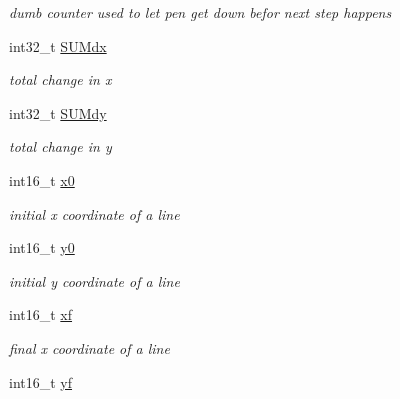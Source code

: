 \begin{DoxyCompactItemize}
\begin{DoxyCompactList}\small\item\em dumb counter used to let pen get down befor next step happens \end{DoxyCompactList}\item 
\hypertarget{classtask__lines_aa7134592021b616761cad2811618aa5c}{int32\-\_\-t \hyperlink{classtask__lines_aa7134592021b616761cad2811618aa5c}{S\-U\-Mdx}}\label{classtask__lines_aa7134592021b616761cad2811618aa5c}

\begin{DoxyCompactList}\small\item\em total change in x \end{DoxyCompactList}\item 
\hypertarget{classtask__lines_a89408d73e8e7a9b53586c55418fd2710}{int32\-\_\-t \hyperlink{classtask__lines_a89408d73e8e7a9b53586c55418fd2710}{S\-U\-Mdy}}\label{classtask__lines_a89408d73e8e7a9b53586c55418fd2710}

\begin{DoxyCompactList}\small\item\em total change in y \end{DoxyCompactList}\item 
\hypertarget{classtask__lines_a4eb29ee98cb4b6a555ddd43804054179}{int16\-\_\-t \hyperlink{classtask__lines_a4eb29ee98cb4b6a555ddd43804054179}{x0}}\label{classtask__lines_a4eb29ee98cb4b6a555ddd43804054179}

\begin{DoxyCompactList}\small\item\em initial x coordinate of a line \end{DoxyCompactList}\item 
\hypertarget{classtask__lines_a0748460c610b0bb8e9cfd8b698206ec1}{int16\-\_\-t \hyperlink{classtask__lines_a0748460c610b0bb8e9cfd8b698206ec1}{y0}}\label{classtask__lines_a0748460c610b0bb8e9cfd8b698206ec1}

\begin{DoxyCompactList}\small\item\em initial y coordinate of a line \end{DoxyCompactList}\item 
\hypertarget{classtask__lines_a13189d18f9ae3bce0e07b23bb9831325}{int16\-\_\-t \hyperlink{classtask__lines_a13189d18f9ae3bce0e07b23bb9831325}{xf}}\label{classtask__lines_a13189d18f9ae3bce0e07b23bb9831325}

\begin{DoxyCompactList}\small\item\em final x coordinate of a line \end{DoxyCompactList}\item 
\hypertarget{classtask__lines_a8cff318f4dc88da0621ba31acbd44d3d}{int16\-\_\-t \hyperlink{classtask__lines_a8cff318f4dc88da0621ba31acbd44d3d}{yf}}\label{classtask__lines_a8cff318f4dc88da0621ba31acbd44d3d}


\end{DoxyCompactItemize}
